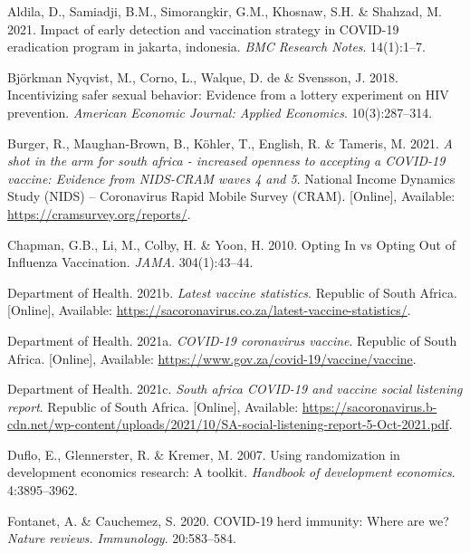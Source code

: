 \documentclass[11pt,preprint, authoryear]{elsarticle}
\numberwithin{equation}{section}
\numberwithin{figure}{section}
\numberwithin{table}{section}
\newlength{\cslhangindent}
\newenvironment{CSLReferences}%
  {\setlength{\parindent}{0pt}%
  \everypar{\setlength{\hangindent}{\cslhangindent}}\ignorespaces}%
  {\par}
\begin{document}
\hypertarget{refs}{}
\begin{CSLReferences}{1}{0}
\leavevmode\hypertarget{ref-erad}{}%
Aldila, D., Samiadji, B.M., Simorangkir, G.M., Khosnaw, S.H. \& Shahzad,
M. 2021. Impact of early detection and vaccination strategy in COVID-19
eradication program in jakarta, indonesia. \emph{BMC Research Notes}.
14(1):1--7.

\leavevmode\hypertarget{ref-hiv}{}%
Björkman Nyqvist, M., Corno, L., Walque, D. de \& Svensson, J. 2018.
Incentivizing safer sexual behavior: Evidence from a lottery experiment
on HIV prevention. \emph{American Economic Journal: Applied Economics}.
10(3):287--314.

\leavevmode\hypertarget{ref-cram}{}%
Burger, R., Maughan-Brown, B., Köhler, T., English, R. \& Tameris, M.
2021. \emph{A shot in the arm for south africa - increased openness to
accepting a COVID-19 vaccine: Evidence from NIDS-CRAM waves 4 and 5}.
National Income Dynamics Study (NIDS) -- Coronavirus Rapid Mobile Survey
(CRAM). {[}Online{]}, Available: \url{https://cramsurvey.org/reports/}.

\leavevmode\hypertarget{ref-opt}{}%
Chapman, G.B., Li, M., Colby, H. \& Yoon, H. 2010. {Opting In vs Opting
Out of Influenza Vaccination}. \emph{JAMA}. 304(1):43--44.

\leavevmode\hypertarget{ref-stat}{}%
Department of Health. 2021b. \emph{Latest vaccine statistics}. Republic
of South Africa. {[}Online{]}, Available:
\url{https://sacoronavirus.co.za/latest-vaccine-statistics/}.

\leavevmode\hypertarget{ref-herd}{}%
Department of Health. 2021a. \emph{COVID-19 coronavirus vaccine}.
Republic of South Africa. {[}Online{]}, Available:
\url{https://www.gov.za/covid-19/vaccine/vaccine}.

\leavevmode\hypertarget{ref-report}{}%
Department of Health. 2021c. \emph{South africa COVID-19 and vaccine
social listening report}. Republic of South Africa. {[}Online{]},
Available:
\url{https://sacoronavirus.b-cdn.net/wp-content/uploads/2021/10/SA-social-listening-report-5-Oct-2021.pdf}.

\leavevmode\hypertarget{ref-random}{}%
Duflo, E., Glennerster, R. \& Kremer, M. 2007. Using randomization in
development economics research: A toolkit. \emph{Handbook of development
economics}. 4:3895--3962.

\leavevmode\hypertarget{ref-immun}{}%
Fontanet, A. \& Cauchemez, S. 2020. COVID-19 herd immunity: Where are
we? \emph{Nature reviews. Immunology}. 20:583--584.


\end{CSLReferences}
\end{document}
